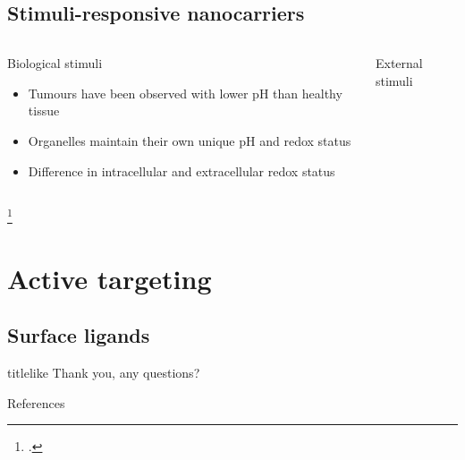 \documentclass[aspectratio=169,compress]{beamer}
\begin{document}
\subsection{Stimuli-responsive nanocarriers}
\begin{frame}{\subsecname}
  \begin{columns}
      \begin{block}{Biological stimuli}
        \begin{itemize}
          \item Tumours have been observed with lower \alert{pH} than healthy tissue~
          \item Organelles maintain their own unique pH and \alert{redox status}
          \item Difference in intracellular and extracellular redox status~
        \end{itemize}
      \end{block}

      \begin{block}{External stimuli}
      \end{block}

  \end{columns}
  \footcitetext{gerweck1996cellular,saito2003drug}
\end{frame}

\section{Active targeting}

\subsection{Surface ligands}

\begin{frame}
  \begin{beamercolorbox}[rounded=true,shadow=true,sep=8pt]{titlelike}\centering\Large
    Thank you, any questions?
  \end{beamercolorbox}
  \begin{block}{References}
    \printbibliography
  \end{block}
\end{frame}
\end{document}
